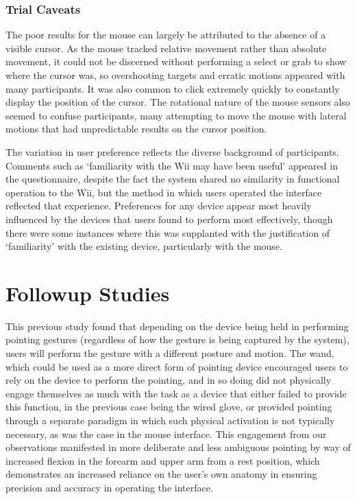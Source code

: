 \subsubsection{Trial Caveats}

The poor results for the mouse can largely be attributed to the absence of a visible cursor. As the mouse tracked relative movement rather than absolute movement, it could not be discerned without performing a select or grab to show where the cursor was, so overshooting targets and erratic motions appeared with many participants. It was also common to click extremely quickly to constantly display the position of the cursor. The rotational nature of the mouse sensors also seemed to confuse participants, many attempting to move the mouse with lateral motions that had unpredictable results on the cursor position.

The variation in user preference reflects the diverse background of participants. Comments such as ‘familiarity with the Wii may have been useful’ appeared in the questionnaire, despite the fact the system shared no similarity in functional operation to the Wii, but the method in which users operated the interface reflected that experience. Preferences for any device appear most heavily influenced by the devices that users found to perform most effectively, though there were some instances where this was supplanted with the justification of ‘familiarity’ with the existing device, particularly with the mouse.

\section{Followup Studies}

This previous study found that depending on the device being held in performing pointing gestures (regardless of how the gesture is being captured by the system), users will perform the gesture with a different posture and motion. The wand, which could be used as a more direct form of pointing device encouraged users to rely on the device to perform the pointing, and in so doing did not physically engage themselves as much with the task as a device that either failed to provide this function, in the previous case being the wired glove, or provided pointing through a separate paradigm in which such physical activation is not typically necessary, as was the case in the mouse interface. This engagement from our observations manifested in more deliberate and less ambiguous pointing by way of increased flexion in the forearm and upper arm from a rest position, which demonstrates an increased reliance on the user's own anatomy in ensuring precision and accuracy in operating the interface.

